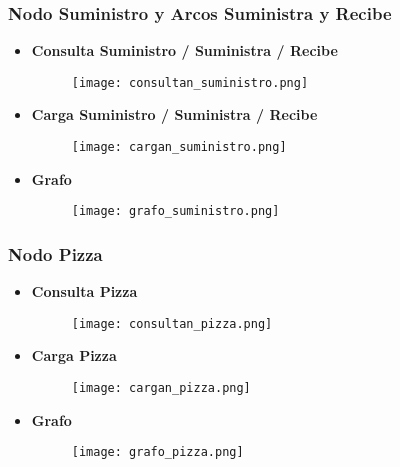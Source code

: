 \documentclass[a4paper]{article}
\begin{document}
\subsubsection{\Large{Nodo Suministro y Arcos Suministra y Recibe}}

\begin{itemize}

    \item \textbf{\large{Consulta Suministro / Suministra / Recibe}}

    \begin{figure}[H]
        \centering
        \texttt{[image: consultan\_suministro.png]}
        \label{fig:consultan_suministro}
    \end{figure}

    \item \textbf{\large{Carga Suministro / Suministra / Recibe}}

    \begin{figure}[H]
        \centering
        \texttt{[image: cargan\_suministro.png]}
        \label{fig:cargan_suministro}
    \end{figure}

    \item \textbf{\large{Grafo}}

    \begin{figure}[H]
        \centering
        \texttt{[image: grafo\_suministro.png]}
        \label{fig:grafo_suministro}
    \end{figure}

\end{itemize}

\subsubsection{\Large{Nodo Pizza}}

\begin{itemize}

    \item \textbf{\large{Consulta Pizza}}

    \begin{figure}[H]
        \centering
        \texttt{[image: consultan\_pizza.png]}
        \label{fig:consultan_pizza}
    \end{figure}

    \item \textbf{\large{Carga Pizza}}

    \begin{figure}[H]
        \centering
        \texttt{[image: cargan\_pizza.png]}
        \label{fig:cargan_pizza}
    \end{figure}

    \item \textbf{\large{Grafo}}

    \begin{figure}[H]
        \centering
        \texttt{[image: grafo\_pizza.png]}
        \label{fig:grafo_pizza}
    \end{figure}

\end{itemize}
\end{document}
